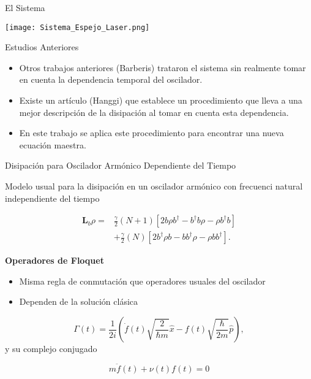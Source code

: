 \documentclass[10pt]{beamer}
\begin{document}
\begin{frame}{El Sistema}

\texttt{[image: Sistema\_Espejo\_Laser.png]} 

\end{frame}

\begin{frame}{Estudios Anteriores}

\begin{itemize}
\item Otros trabajos anteriores (Barberis) trataron el sistema sin realmente tomar en cuenta la dependencia temporal del oscilador.

\item Existe un artículo (Hanggi) que establece un procedimiento que lleva a una mejor descripción de la disipación al tomar en cuenta esta dependencia.

\item En este trabajo se aplica este procedimiento para encontrar una nueva ecuación maestra.

\end{itemize}

\end{frame}

\begin{frame}{Disipación para Oscilador Armónico Dependiente del Tiempo}

Modelo usual para la disipación en un oscilador armónico con frecuenci natural independiente del tiempo

\begin{align*}
\textbf{L}_b \rho =& \frac{\gamma}{2}(N + 1)[2b\rho b^\dagger -b^\dagger b\rho - \rho b^\dagger b ] \nonumber \\
 &+ \frac{\gamma}{2}(N)[2b^\dagger\rho b -bb^\dagger\rho - \rho  bb^\dagger ].
\end{align*} 

\end{frame}

\begin{frame}

\textbf{Operadores de Floquet}

\begin{itemize}
\item Misma regla de conmutación que operadores usuales del oscilador

\item Dependen de la solución clásica
\end{itemize}

\begin{equation*}
\Gamma(t) = \frac{1}{2i}(\dot{f}(t)\sqrt{\frac{2}{\hbar m}}\hat{x}-f(t)\sqrt{\frac{\hbar}{2m}}\hat{p}),
\end{equation*} y su complejo conjugado

\begin{equation*}
m\ddot{f}(t) + \nu(t)f(t)=0
\end{equation*}

\end{frame}
\end{document}
